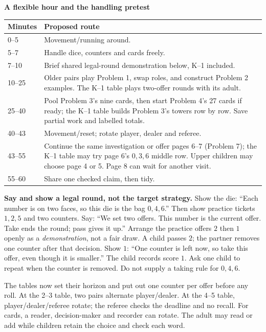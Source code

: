 \documentclass[11pt,letterpaper]{article}
\newcommand{\topic}[1]{\par\textbf{\large #1}\par}
\begin{document}
\newpage
\topic{A flexible hour and the handling pretest}
\begin{center}\small
\begin{tabular}{@{}p{0.65in}p{6.17in}@{}}\toprule
Minutes & Proposed route \\\midrule
0--5 & Movement/running around. \\
5--7 & Handle dice, counters and cards freely. \\
7--10 & Brief shared legal-round demonstration below, K--1 included. \\
10--25 & Older pairs play Problem 1, swap roles, and construct Problem 2 examples. The K--1 table plays two-offer rounds with its adult. \\
25--40 & Pool Problem 3's nine cards, then start Problem 4's 27 cards if ready; the K--1 table builds Problem 3's towers row by row. Save partial work and labelled totals. \\
40--43 & Movement/reset; rotate player, dealer and referee. \\
43--55 & Continue the same investigation or offer pages 6--7 (Problem 7); the K--1 table may try page 6's $0,3,6$ middle row. Upper children may choose page 4 or 5. Page 8 can wait for another visit. \\
55--60 & Share one checked claim, then tidy. \\\bottomrule
\end{tabular}\end{center}

\textbf{Say and show a legal round, not the target strategy.} Show the die:
``Each number is on two faces, so this die is the bag $0,4,6$.'' Then show
practice tickets $1,2,5$ and two counters. Say: ``We set two offers. This number
is the current offer. Take ends the round; pass gives it up.'' Arrange the
practice offers $2$ then $1$ openly as a \emph{demonstration}, not a fair draw.
A child passes $2$; the partner removes one counter after that decision. Show $1$: ``One counter is left now, so take this
offer, even though it is smaller.'' The child records score $1$. Ask one child to repeat when the counter is removed.
Do not supply a taking rule for $0,4,6$.

The tables now set their horizon and put out one counter per offer before
any roll. At the 2--3 table, two pairs alternate player/dealer. At the 4--5 table, player/dealer/referee
rotate; the referee checks the deadline and no recall. For cards, a reader,
decision-maker and recorder can rotate. The adult may read or add while
children retain the choice and check each word.
\end{document}
